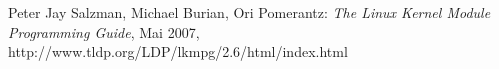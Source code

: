 \begingroup
\renewcommand{\chapter}[2]{\section#1{#2}}%
\begin{thebibliography}{99}

	Peter Jay Salzman, Michael Burian, Ori Pomerantz:
	\emph{The Linux Kernel Module Programming Guide},
	Mai 2007, http://www.tldp.org/LDP/lkmpg/2.6/html/index.html






	\end{thebibliography}
\endgroup